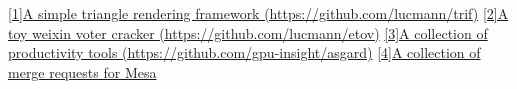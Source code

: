 
\begin{cventries}
    \cventry
    {}
    {\hypertarget{cpp-proj}{\href{https://github.com/lucmann/trif}{[1]A simple triangle rendering framework (https://github.com/lucmann/trif)}}}
    {}
    {}
    {}
    \cventry
    {}
    {\hypertarget{python-proj}{\href{https://github.com/lucmann/etov}{[2]A toy weixin voter cracker (https://github.com/lucmann/etov)}}}
    {}
    {}
    {}
    \cventry
    {}
    {\hypertarget{shell-proj}{\href{https://github.com/gpu-insight/asgard}{[3]A collection of productivity tools (https://github.com/gpu-insight/asgard)}}}
    {}
    {}
    {}
    \cventry
    {}
    {\hypertarget{mesa-mr}{\href{https://gitlab.freedesktop.org/mesa/mesa/-/merge\_requests?scope=all&state=all&author\_username=lucmann}{[4]A collection of merge requests for Mesa}}}
    {}
    {}
    {}
\end{cventries}
